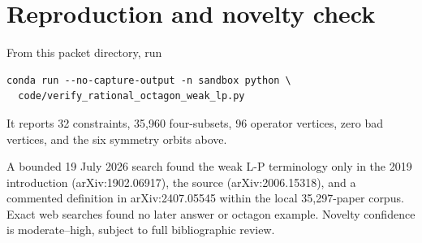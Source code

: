 \documentclass[11pt]{article}
\begin{document}
\section{Reproduction and novelty check}

From this packet directory, run
\begin{verbatim}
conda run --no-capture-output -n sandbox python \
  code/verify_rational_octagon_weak_lp.py
\end{verbatim}
It reports 32 constraints, 35,960 four-subsets, 96 operator vertices, zero
bad vertices, and the six symmetry orbits above.

A bounded 19 July 2026 search found the weak L-P terminology only in the 2019
introduction (arXiv:1902.06917), the source (arXiv:2006.15318), and a commented
definition in arXiv:2407.05545 within the local 35,297-paper corpus. Exact web
searches found no later answer or octagon example. Novelty confidence is
moderate--high, subject to full bibliographic review.
\end{document}
